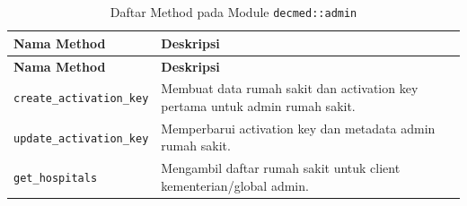 \begin{longtable}{|Y{0.45\textwidth}|Y{0.47\textwidth}|}
	\caption{Daftar Method pada Module \texttt{decmed::admin}}
	\label{tab:daftar-method-decmed-admin}                                                                          \\
	\hline
	\textbf{Nama Method}             & \textbf{Deskripsi}                                                           \\
	\hline
	\endfirsthead
	\hline
	\textbf{Nama Method}             & \textbf{Deskripsi}                                                           \\
	\hline
	\endhead

	\texttt{create\_activation\_key} & Membuat data rumah sakit dan activation key pertama untuk admin rumah sakit. \\ \hline
	\texttt{update\_activation\_key} & Memperbarui activation key dan metadata admin rumah sakit.                   \\ \hline
	\texttt{get\_hospitals}          & Mengambil daftar rumah sakit untuk client kementerian/global admin.          \\ \hline
\end{longtable}
